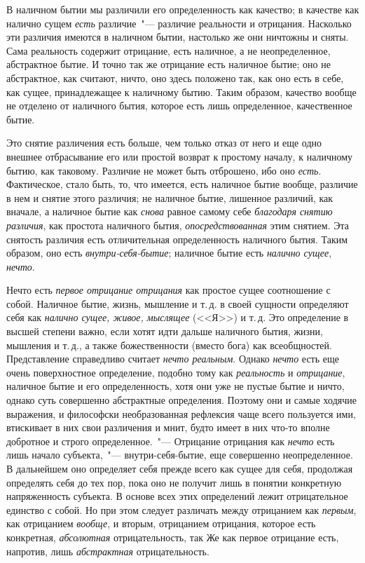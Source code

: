 В наличном бытии мы различили его определенность
как качество; в качестве как налично сущем \emph{есть} различие~"---
различие реальности и отрицания. Насколько
эти различия имеются в наличном бытии, настолько же
они ничтожны и сняты. Сама реальность содержит отрицание,
есть наличное, а не неопределенное, абстрактное
бытие. И точно так же отрицание есть наличное бытие;
оно не абстрактное, как считают, ничто, оно здесь положено
так, как оно есть в себе, как сущее, принадлежащее
к наличному бытию. Таким образом, качество вообще не
отделено от наличного бытия, которое есть лишь определенное,
качественное бытие.

Это снятие различения есть больше, чем только отказ
от него и еще одно внешнее отбрасывание его или простой
возврат к простому началу, к наличному бытию,
как таковому. Различие не может быть отброшено, ибо
оно \emph{есть}. Фактическое, стало быть, то, что имеется, есть
наличное бытие вообще, различие в нем и снятие этого
различия; не наличное бытие, лишенное различий, как
вначале, а наличное бытие как \emph{снова} равное самому себе
\emph{благодаря снятию различия}, как простота наличного
бытия, \emph{опосредствованная} этим снятием. Эта снятость
различия есть отличительная определенность наличного
бытия. Таким образом, оно есть \emph{внутри-себя-бытие}; наличное
бытие есть \emph{налично сущее}, \emph{нечто}.

Нечто есть \emph{первое отрицание отрицания} как простое
сущее соотношение с собой. Наличное бытие, жизнь,
мышление и т.\,д. в своей сущности определяют себя как
\emph{налично сущее, живое, мыслящее} (<<Я>>) и т.\,д. Это определение
в высшей степени важно, если хотят идти дальше
наличного бытия, жизни, мышления и т.\,д., а также
божественности (вместо бога) как всеобщностей. Представление
справедливо считает \emph{нечто реальным}. Однако
\emph{нечто} есть еще очень поверхностное определение, подобно
тому как \emph{реальность} и \emph{отрицание}, наличное бытие и
его определенность, хотя они уже не пустые бытие и
ничто, однако суть совершенно абстрактные определения.
Поэтому они и самые ходячие выражения, и философски
необразованная рефлексия чаще всего пользуется
ими, втискивает в них свои различения и мнит, будто
имеет в них что-то вполне добротное и строго определенное.~"---
Отрицание отрицания как \emph{нечто} есть лишь начало
субъекта,~"--- внутри-себя-бытие, еще совершенно неопределенное.
В дальнейшем оно определяет себя прежде
всего как сущее для себя, продолжая определять себя до
тех пор, пока оно не получит лишь в понятии конкретную
напряженность субъекта. В основе всех этих определений
лежит отрицательное единство с собой. Но при этом
следует различать между отрицанием как \emph{первым}, как
отрицанием \emph{вообще}, и вторым, отрицанием отрицания,
которое есть конкретная, \emph{абсолютная} отрицательность,
так Же как первое отрицание есть, напротив, лишь
\emph{абстрактная} отрицательность.

